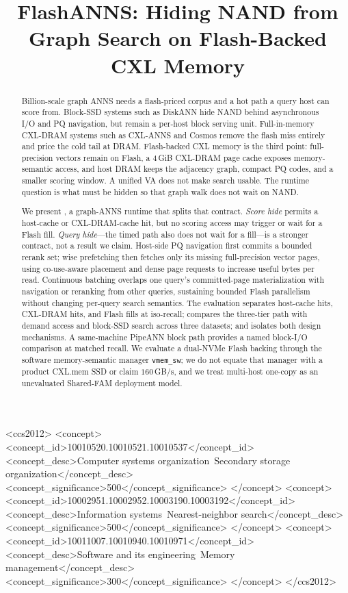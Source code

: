 \documentclass[sigplan,anonymous,review,nonacm]{acmart}
\begin{document}
\title{FlashANNS: Hiding NAND from Graph Search on Flash-Backed CXL Memory}

\begin{abstract}
Billion-scale graph ANNS needs a flash-priced corpus and a hot path a query host can score from.
Block-SSD systems such as DiskANN hide NAND behind asynchronous I/O and PQ navigation, but remain a per-host block serving unit.
Full-in-memory CXL-DRAM systems such as CXL-ANNS and Cosmos remove the flash miss entirely and price the cold tail at DRAM.
Flash-backed CXL memory is the third point: full-precision vectors remain on Flash, a 4\,GiB CXL-DRAM page cache exposes memory-semantic access, and host DRAM keeps the adjacency graph, compact PQ codes, and a smaller scoring window.
A unified VA does not make search usable.
The runtime question is what must be hidden so that graph walk does not wait on NAND.

We present \sys{}, a graph-ANNS runtime that splits that contract.
\emph{Score hide} permits a host-cache or CXL-DRAM-cache hit, but no scoring access may trigger or wait for a Flash fill.
\emph{Query hide}---the timed path also does not wait for a fill---is a stronger contract, not a result we claim.
Host-side PQ navigation first commits a bounded rerank set; wise prefetching then fetches only its missing full-precision vector pages, using co-use-aware placement and dense page requests to increase useful bytes per read.
Continuous batching overlaps one query's committed-page materialization with navigation or reranking from other queries, sustaining bounded Flash parallelism without changing per-query search semantics.
The evaluation separates host-cache hits, CXL-DRAM hits, and Flash fills at iso-recall; compares the three-tier path with demand access and block-SSD search across three datasets; and isolates both design mechanisms.
A same-machine PipeANN block path provides a named block-I/O comparison at matched recall.
We evaluate a dual-NVMe Flash backing through the software memory-semantic manager \texttt{vmem\_sw}; we do not equate that manager with a product CXL.mem SSD or claim $160$\,GB/s, and we treat multi-host one-copy as an unevaluated Shared-FAM deployment model.
\end{abstract}

\begin{CCSXML}
<ccs2012>
 <concept>
  <concept_id>10010520.10010521.10010537</concept_id>
  <concept_desc>Computer systems organization~Secondary storage organization</concept_desc>
  <concept_significance>500</concept_significance>
 </concept>
 <concept>
  <concept_id>10002951.10002952.10003190.10003192</concept_id>
  <concept_desc>Information systems~Nearest-neighbor search</concept_desc>
  <concept_significance>500</concept_significance>
 </concept>
 <concept>
  <concept_id>10011007.10010940.10010971</concept_id>
  <concept_desc>Software and its engineering~Memory management</concept_desc>
  <concept_significance>300</concept_significance>
 </concept>
</ccs2012>
\end{CCSXML}
\end{document}
